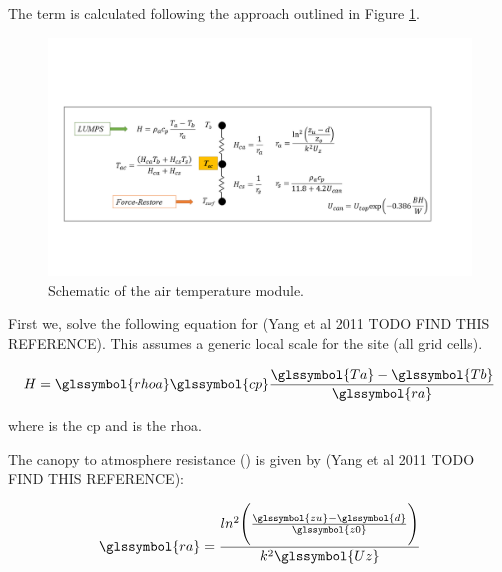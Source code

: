 \documentclass[final,3p,times,authoryear]{elsarticle}
\begin{document}
The  term is calculated following the approach outlined in Figure \ref{fig:Tac}. 


\begin{figure}[!htbp]
\includegraphics[trim=13mm 43mm 32mm 55mm, clip,scale=0.60]{images/Tac.png}
 \caption{Schematic of the air temperature module.} \label{fig:Tac}
\end{figure}


First we, solve the following equation for  (Yang et al 2011 TODO FIND THIS REFERENCE). This assumes a generic local scale  for the site (all grid cells). 



\begin{equation} 
H = \glssymbol{rhoa} \glssymbol{cp} \frac{\glssymbol{Ta}-\glssymbol{Tb}}{\glssymbol{ra}}
\label{eq:H_air} \end{equation}

where  is the \glsdesc{cp} and  is the \glsdesc{rhoa}. 

The canopy to atmosphere resistance () is given by (Yang et al 2011 TODO FIND THIS REFERENCE):

\begin{equation} 
\glssymbol{ra} = \frac{ln^{2} \Bigg( \frac{\glssymbol{zu}-\glssymbol{d}}{\glssymbol{z0}}   \Bigg)   } {k^{2} \glssymbol{Uz}}
\label{eq:ra} \end{equation}

\end{document}
